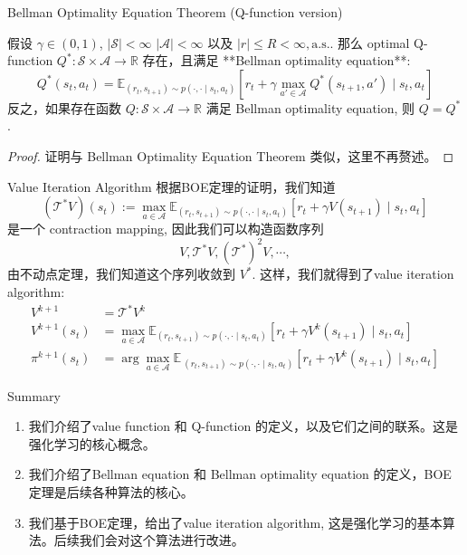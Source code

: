 \documentclass[aspectratio=169]{beamer}
\begin{document}
\begin{frame}{Bellman Optimality Equation Theorem (Q-function version)}
    \begin{theorem}
        假设 $\gamma\in(0,1)$, $|\mathcal{S}|<\infty$ $|\mathcal{A}|<\infty$ 以及 $|r|\leq R<\infty, \mathrm{a.s.}$.  
        那么 optimal Q-function $Q^*:\mathcal{S}\times\mathcal{A}\to\mathbb{R}$ 存在，且满足 **Bellman optimality equation**:
        \begin{equation}
        Q^*(s_t, a_t) = \mathbb{E}_{(r_t,s_{t+1})\sim p(\cdot,\cdot\mid s_t,a_t)}\left[r_t+\gamma \max_{a'\in\mathcal{A}}Q^*(s_{t+1}, a')\mid s_t, a_t\right]
        \end{equation}
        反之，如果存在函数 $Q:\mathcal{S}\times\mathcal{A}\to\mathbb{R}$ 满足 Bellman optimality equation, 则 $Q=Q^*$.
    \end{theorem}
    \begin{proof}
        证明与 Bellman Optimality Equation Theorem 类似，这里不再赘述。
    \end{proof}
\end{frame}

\begin{frame}{Value Iteration Algorithm}
    根据BOE定理的证明，我们知道
    \begin{equation}
        (\mathcal{T}^* V)(s_t) := \max_{a\in\mathcal{A}}\mathbb{E}_{(r_t,s_{t+1})\sim p(\cdot,\cdot\mid s_t,a_t)}\left[r_t+\gamma V(s_{t+1})\mid s_t, a_t\right]
    \end{equation}
    是一个 contraction mapping, 因此我们可以构造函数序列
    \begin{equation}
        V, \mathcal{T}^* V, (\mathcal{T}^*)^2 V,\cdots,
    \end{equation}
    由不动点定理，我们知道这个序列收敛到 $V^*$. 这样，我们就得到了value iteration algorithm:
    \begin{align}
        V^{k+1}&=\mathcal{T}^* V^k\\
        V^{k+1}(s_t) &= \max_{a\in\mathcal{A}}\mathbb{E}_{(r_t,s_{t+1})\sim p(\cdot,\cdot\mid s_t,a_t)}\left[r_t+\gamma V^k(s_{t+1})\mid s_t, a_t\right]\\
        \pi^{k+1}(s_t) &= \arg\max_{a\in\mathcal{A}}\mathbb{E}_{\ (r_t,s_{t+1})\sim p(\cdot,\cdot\mid s_t,a_t)}\left[r_t+\gamma V^k(s_{t+1})\mid s_t, a_t\right]
    \end{align}
\end{frame}

\begin{frame}{Summary}
    \begin{enumerate}
        \item 我们介绍了value function 和 Q-function 的定义，以及它们之间的联系。这是强化学习的核心概念。
        \item 我们介绍了Bellman equation 和 Bellman optimality equation 的定义，BOE定理是后续各种算法的核心。
        \item 我们基于BOE定理，给出了value iteration algorithm, 这是强化学习的基本算法。后续我们会对这个算法进行改进。
    \end{enumerate}
\end{frame}
\end{document}
